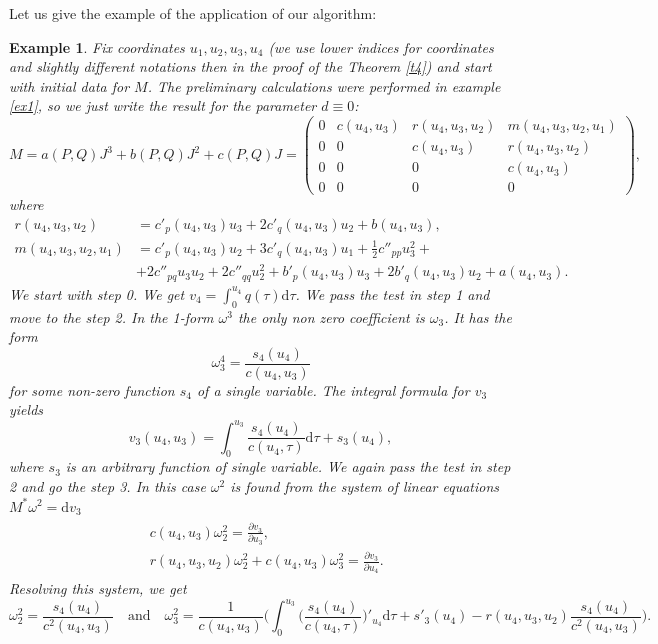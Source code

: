 \documentclass[12pt]{article}
\newtheorem{Ex}{Example}[section]
\theoremstyle{remark}
\newcommand{\ddd}{\mathrm{d}}
\newcommand{\pd}[2]{\frac{\partial#1}{\partial#2}}
\begin{document}
Let us give the example of the application of our algorithm:
\begin{Ex}\label{ex2}
\rm{
Fix coordinates $u_1, u_2, u_3, u_4$ (we use lower indices for coordinates and slightly different notations then in the proof of the Theorem \ref{t4}) and start with initial data for $M$. The preliminary calculations were performed in example \eqref{ex1}, so we just write the result for the parameter $d \equiv 0$:
$$
M = a(P, Q)J^3 + b(P, Q) J^2 + c(P, Q) J = \left( \begin{array}{cccc}
     0 & c(u_4, u_3) & r(u_4, u_3, u_2) & m(u_4, u_3, u_2, u_1)  \\
     0 & 0 & c(u_4, u_3) & r(u_4, u_3, u_2) \\
     0 & 0 & 0 & c(u_4, u_3) \\
     0 & 0 & 0 & 0
\end{array}\right),
$$
where
$$
\begin{aligned}
r(u_4, u_3, u_2) & = c'_p (u_4, u_3) u_3 + 2 c'_q (u_4, u_3) u_2 + b(u_4, u_3), \\
m(u_4, u_3, u_2, u_1) & = c'_p (u_4, u_3)u_2 + 3 c'_q (u_4, u_3)u_1 + \frac{1}{2} c''_{pp} u_3^2 + \\
& + 2 c''_{pq}u_3 u_2 + 2 c''_{qq} u_2^2 + b'_p (u_4, u_3) u_3 + 2 b'_q (u_4, u_3) u_2 + a(u_4, u_3).
\end{aligned}
$$
We start with step 0. We get $v_4 = \int_0^{u_4} q(\tau) \ddd \tau$. We pass the test in step 1 and move to the step 2. In the 1-form $\omega^3$ the only non zero coefficient is $\omega_3$. It has the form
$$
\omega^4_3 = \frac{s_4(u_4)}{c(u_4, u_3)}
$$
for some non-zero function $s_4$ of a single variable. The integral formula for $v_3$ yields
$$
v_3(u_4, u_3) = \int_0^{u_3} \frac{s_4(u_4)}{c(u_4, \tau)} \ddd \tau + s_3 (u_4),
$$
where $s_3$ is an arbitrary function of single variable. We again pass the test in step 2 and go the step 3. In this case $\omega^2$ is found from the system of linear equations $M^* \omega^2 = \ddd v_3$
$$
\begin{aligned}
\begin{aligned}
& c(u_4, u_3) \omega^2_2 = \pd{v_3}{u_3}, \\
& r(u_4, u_3, u_2) \omega^2_2 + c(u_4, u_3) \omega^2_3 = \pd{v_3}{u_4}.
\end{aligned}
\end{aligned}
$$
Resolving this system, we get
$$
\omega^2_2 = \frac{s_4(u_4)}{c^2(u_4, u_3)} \quad \text{and} \quad \omega^2_3 = \frac{1}{c(u_4, u_3)} \Bigg( \int_0^{u_3}\Big( \frac{s_4(u_4)}{c(u_4, \tau)}\Big)'_{u_4} \ddd \tau + s'_3(u_4) - r(u_4, u_3, u_2) \frac{s_4(u_4)}{c^2(u_4, u_3)}\Bigg).
$$}
\end{Ex}
\end{document}
